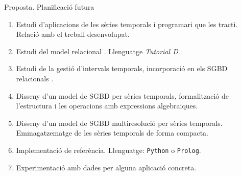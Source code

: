 \begin{frame}{Proposta. Planificació futura}


  \begin{enumerate}

  \item Estudi d'aplicacions de les sèries temporals i programari que
    les tracti. Relació amb el treball desenvolupat.

  \item Estudi del model relacional \parencite{date:introduction,
      date06,date:dictionary, date:thethirdmanifesto}. Llenguatge
    \emph{Tutorial D}.

  \item Estudi de la gestió d'intervals temporals, incorporació en els
    SGBD relacionals \parencite{date02:_tempor_data_relat_model}.

  \item Disseny d'un model de SGBD per sèries temporals, formalització
    de l'estructura i les operacions amb expressions algebraiques.

  \item Disseny d'un model de SGBD multiresolució per sèries
    temporals. Emmagatzematge de les sèries temporals de forma compacta.

  \item Implementació de referència. Llenguatge: \texttt{Python} o
    \texttt{Prolog}.

  \item Experimentació amb dades per alguna aplicació concreta.

\end{enumerate}


\end{frame}



